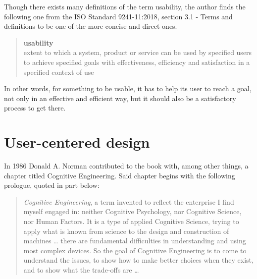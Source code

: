
Though there exists many definitions of the term usability, the author finds the
following one from the ISO Standard 9241-11:2018\cite{citeISO9241}, section 3.1
- Terms and definitions to be one of the more concise and direct ones.
\begin{quote}
  \textbf{usability} \\
  extent to which a system, product or service can be used by specified users to
  achieve specified goals with effectiveness, efficiency and satisfaction in a
  specified context of use
\end{quote}

In other words, for something to be usable, it has to help its user to
reach a goal, not only in an effective and efficient way, but it should also be
a satisfactory process to get there.

\section{User-centered design}

In 1986 Donald A. Norman contributed to the book
\cite{citeUserCenteredNorman} with, among
other things, a chapter titled Cognitive Engineering\cite[p.
31]{citeUserCenteredNorman}. Said chapter begins with the following prologue,
quoted in part below:

\begin{quote}
  \textit{Cognitive Engineering}, a term invented to reflect the enterprise I find
  myself engaged in: neither Cognitive Psychology, nor Cognitive Science, nor
  Human Factors. It is a type of applied Cognitive Science, trying to apply
  what is known from science to the design and construction of machines \ldots
  there are fundamental difficulties in
  understanding and using most complex devices. So the goal of Cognitive
  Engineering is to come to understand the issues, to show how to make better
  choices when they exist, and to show what the trade-offs are \ldots
\end{quote}

